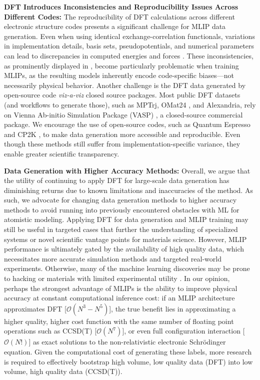 \textbf{DFT Introduces Inconsistencies and Reproducibility Issues Across Different Codes:} 
The reproducibility of DFT calculations across different electronic structure codes presents a significant challenge for MLIP data generation. Even when using identical exchange-correlation functionals, variations in implementation details, basis sets, pseudopotentials, and numerical parameters can lead to discrepancies in computed energies and forces \citep{schuch2009computational,bootsmaPopularIntegrationGrids2019}. These inconsistencies, as prominently displayed in \citet{lejaeghere2016reproducibility,bosoniHowVerifyPrecision2024}, become particularly problematic when training MLIPs, as the resulting models inherently encode code-specific biases---not necessarily physical behavior. Another challenge is the DFT data generated by open-source code \textit{viz-a-viz} closed source packages. Most public DFT datasets (and workflows to generate those), such as MPTrj, OMat24 \citep{barroso2024open}, and Alexandria, rely on Vienna Ab-initio Simulation Package (VASP) \citep{kresse1994ab}, a closed-source commercial package. We encourage the use of open-source codes, such as Quantum Espresso \citep{giannozzi2009quantum} and CP2K \citep{kuhne2020cp2k}, to make data generation more accessible and reproducible. Even though these methods still suffer from implementation-specific variance, they enable greater scientific transparency.


\textbf{Data Generation with Higher Accuracy Methods:} Overall, we argue that the utility of continuing to apply DFT for large-scale data generation has diminishing returns due to known limitations and inaccuracies of the method. As such, we advocate for changing data generation methods to higher accuracy methods to avoid running into previously encountered obstacles with ML for atomistic modeling. Applying DFT for data generation and MLIP training may still be useful in targeted cases that further the understanding of specialized systems \citep{wang2024perovs, louIntelligibleModelsClassification2012} or novel scientific vantage points for materials science. However, MLIP performance is ultimately gated by the availability of high quality data, which necessitates more accurate simulation methods and targeted real-world experiments. Otherwise, many of the machine learning discoveries may be prone to hacking \citep{ghugare2024searching, govindarajan2024crystal} or materials with limited experimental utility \citep{cheetham2024artificial}. In our opinion, perhaps the strongest advantage of MLIPs is the ability to improve physical accuracy at constant computational inference cost: if an MLIP architecture approximates DFT [$\mathcal{O}(N^3-N^5)$], the true benefit lies in approximating a higher quality, higher cost function with the same number of floating point operations such as CCSD(T) [$\mathcal{O}(N^7)$], or even full configuration interaction [$\mathcal{O}(N!)$] as exact solutions to the non-relativistic electronic Schr\"{o}dinger equation. Given the computational cost of generating these labels, more research is required to effectively bootstrap high volume, low quality data (DFT) into low volume, high quality data (CCSD(T)). 

